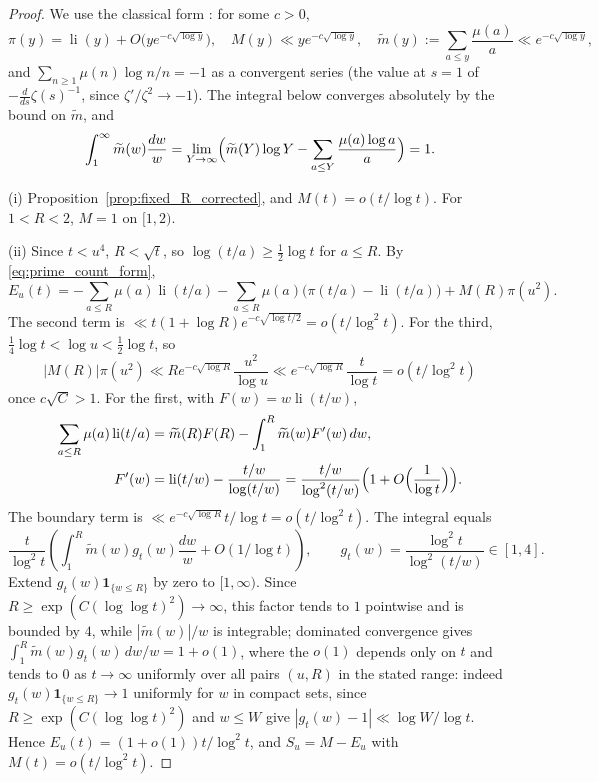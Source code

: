 \documentclass[11pt]{amsart}
\numberwithin{equation}{section}
\theoremstyle{plain}
\theoremstyle{definition}
\theoremstyle{remark}
\DeclareMathOperator{\li}{li}
\newcommand{\mt}{\widetilde{m}}
\begin{document}
\begin{proof}
We use the classical form \cite{MontgomeryVaughan2007}: for some $c>0$,
\begin{equation}
\label{eq:pnt_inputs}
  \pi(y)=\li(y)+O\bigl(ye^{-c\sqrt{\log y}}\bigr),\quad
  M(y)\ll ye^{-c\sqrt{\log y}},\quad
  \mt(y):=\sum_{a\le y}\frac{\mu(a)}a\ll e^{-c\sqrt{\log y}},
\end{equation}
and $\sum_{n\ge1}\mu(n)\log n/n=-1$ as a convergent series (the value at
$s=1$ of $-\frac{d}{ds}\zeta(s)^{-1}$, since $\zeta'/\zeta^2\to-1$). The
integral below converges absolutely by the bound on $\mt$, and
\begin{equation}
\label{eq:mtilde_integral}
  \int_1^\infty\mt(w)\frac{dw}w
  =\lim_{Y\to\infty}\Bigl(\mt(Y)\log Y-\sum_{a\le Y}\frac{\mu(a)\log a}a\Bigr)=1.
\end{equation}

(i) Proposition~\ref{prop:fixed_R_corrected}, and $M(t)=o(t/\log t)$. For
$1<R<2$, $M=1$ on $[1,2)$.

(ii) Since $t<u^4$, $R<\sqrt t$, so $\log(t/a)\ge\frac12\log t$ for $a\le R$.
By \eqref{eq:prime_count_form},
\begin{equation}
\label{eq:E_three_terms}
  E_u(t)=-\sum_{a\le R}\mu(a)\li(t/a)
  -\sum_{a\le R}\mu(a)\bigl(\pi(t/a)-\li(t/a)\bigr)+M(R)\pi(u^2).
\end{equation}
The second term is $\ll t(1+\log R)e^{-c\sqrt{\log t/2}}=o(t/\log^2t)$. For
the third, $\tfrac14\log t<\log u<\tfrac12\log t$, so
\[
|M(R)|\pi(u^2)\ll Re^{-c\sqrt{\log R}}\frac{u^2}{\log u}
\ll e^{-c\sqrt{\log R}}\frac{t}{\log t}=o(t/\log^2t)
\]
once $c\sqrt C>1$. For the first, with $F(w)=w\li(t/w)$,
\begin{align}
\label{eq:partial_summation_li}
  \sum_{a\le R}\mu(a)\li(t/a)
  &=\mt(R)F(R)-\int_1^R\mt(w)F'(w)\,dw,\\
  F'(w)&=\li(t/w)-\frac{t/w}{\log(t/w)}
  =\frac{t/w}{\log^2(t/w)}\Bigl(1+O\Bigl(\frac1{\log t}\Bigr)\Bigr).\notag
\end{align}
The boundary term is $\ll e^{-c\sqrt{\log R}}t/\log t=o(t/\log^2t)$. The
integral equals
\[
\frac t{\log^2t}\left(\int_1^R\mt(w)g_t(w)\frac{dw}w+O(1/\log t)\right),
\qquad
g_t(w)=\frac{\log^2t}{\log^2(t/w)}\in[1,4].
\]
Extend $g_t(w)\mathbf1_{\{w\le R\}}$ by zero to $[1,\infty)$. Since
$R\ge\exp(C(\log\log t)^2)\to\infty$, this factor tends to $1$ pointwise and is
bounded by $4$, while $|\mt(w)|/w$ is integrable; dominated convergence gives
$\int_1^R\mt(w)g_t(w)\,dw/w=1+o(1)$, where the $o(1)$ depends only on $t$
and tends to $0$ as $t\to\infty$ uniformly over all pairs $(u,R)$ in the
stated range: indeed $g_t(w)\mathbf 1_{\{w\le R\}}\to1$ uniformly for $w$ in
compact sets, since $R\ge\exp(C(\log\log t)^2)$ and $w\le W$ give
$|g_t(w)-1|\ll\log W/\log t$. Hence
$E_u(t)=(1+o(1))t/\log^2t$, and $S_u=M-E_u$ with $M(t)=o(t/\log^2t)$.
\end{proof}
\end{document}
